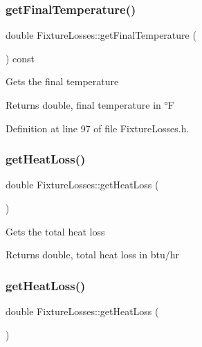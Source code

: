 \subsubsection{\texorpdfstring{get\+Final\+Temperature()}{getFinalTemperature()}\hspace{0.1cm}{\footnotesize\ttfamily [3/3]}}
{\footnotesize\ttfamily double Fixture\+Losses\+::get\+Final\+Temperature (\begin{DoxyParamCaption}{ }\end{DoxyParamCaption}) const\hspace{0.3cm}{\ttfamily [inline]}}

Gets the final temperature \begin{DoxyReturn}{Returns}
double, final temperature in °F 
\end{DoxyReturn}


Definition at line 97 of file Fixture\+Losses.\+h.

\mbox{\label{class_fixture_losses_a6829840bdf0607d52adaa9b5ee6ded75}} 
\subsubsection{\texorpdfstring{get\+Heat\+Loss()}{getHeatLoss()}\hspace{0.1cm}{\footnotesize\ttfamily [1/3]}}
{\footnotesize\ttfamily double Fixture\+Losses\+::get\+Heat\+Loss (\begin{DoxyParamCaption}{ }\end{DoxyParamCaption})}

Gets the total heat loss \begin{DoxyReturn}{Returns}
double, total heat loss in btu/hr 
\end{DoxyReturn}
\mbox{\label{class_fixture_losses_a6829840bdf0607d52adaa9b5ee6ded75}} 
\subsubsection{\texorpdfstring{get\+Heat\+Loss()}{getHeatLoss()}\hspace{0.1cm}{\footnotesize\ttfamily [2/3]}}
{\footnotesize\ttfamily double Fixture\+Losses\+::get\+Heat\+Loss (\begin{DoxyParamCaption}{ }\end{DoxyParamCaption})}

